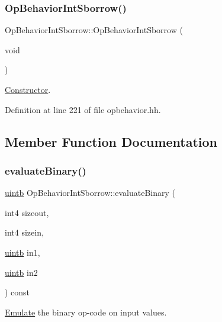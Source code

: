 \subsubsection{\texorpdfstring{OpBehaviorIntSborrow()}{OpBehaviorIntSborrow()}}
{\footnotesize\ttfamily Op\+Behavior\+Int\+Sborrow\+::\+Op\+Behavior\+Int\+Sborrow (\begin{DoxyParamCaption}\item[{void}]{ }\end{DoxyParamCaption})\hspace{0.3cm}{\ttfamily [inline]}}



\mbox{\hyperlink{class_constructor}{Constructor}}. 



Definition at line 221 of file opbehavior.\+hh.



\subsection{Member Function Documentation}
\mbox{\label{class_op_behavior_int_sborrow_a4c3b863f3cd6aaa1bc2cf40b88e49f59}} 
\subsubsection{\texorpdfstring{evaluateBinary()}{evaluateBinary()}}
{\footnotesize\ttfamily \mbox{\hyperlink{types_8h_a2db313c5d32a12b01d26ac9b3bca178f}{uintb}} Op\+Behavior\+Int\+Sborrow\+::evaluate\+Binary (\begin{DoxyParamCaption}\item[{int4}]{sizeout,  }\item[{int4}]{sizein,  }\item[{\mbox{\hyperlink{types_8h_a2db313c5d32a12b01d26ac9b3bca178f}{uintb}}}]{in1,  }\item[{\mbox{\hyperlink{types_8h_a2db313c5d32a12b01d26ac9b3bca178f}{uintb}}}]{in2 }\end{DoxyParamCaption}) const\hspace{0.3cm}{\ttfamily [virtual]}}



\mbox{\hyperlink{class_emulate}{Emulate}} the binary op-\/code on input values. 


